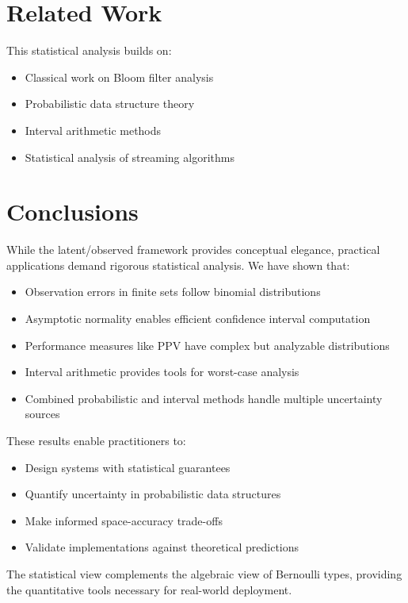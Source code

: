 \documentclass[11pt,final,hidelinks]{article}
\begin{document}
\section{Related Work}

This statistical analysis builds on:
\begin{itemize}
    \item Classical work on Bloom filter analysis \cite{bloom1970,mitzenmacher2002}
    \item Probabilistic data structure theory \cite{broder2004}
    \item Interval arithmetic methods \cite{moore1966}
    \item Statistical analysis of streaming algorithms \cite{cormode2005}
\end{itemize}

\section{Conclusions}

While the latent/observed framework provides conceptual elegance, practical applications demand rigorous statistical analysis. We have shown that:

\begin{itemize}
    \item Observation errors in finite sets follow binomial distributions
    \item Asymptotic normality enables efficient confidence interval computation
    \item Performance measures like PPV have complex but analyzable distributions
    \item Interval arithmetic provides tools for worst-case analysis
    \item Combined probabilistic and interval methods handle multiple uncertainty sources
\end{itemize}

These results enable practitioners to:
\begin{itemize}
    \item Design systems with statistical guarantees
    \item Quantify uncertainty in probabilistic data structures
    \item Make informed space-accuracy trade-offs
    \item Validate implementations against theoretical predictions
\end{itemize}

The statistical view complements the algebraic view of Bernoulli types, providing the quantitative tools necessary for real-world deployment.




\end{document}
